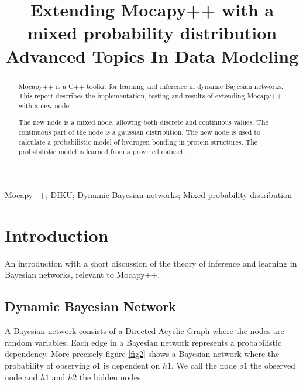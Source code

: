 \documentclass[10pt, conference, compsocconf,a4paper]{IEEEtran}
\begin{document}
\title{Extending Mocapy++ with a mixed probability distribution\\Advanced Topics In Data Modeling}

\author{
}

\maketitle

\begin{abstract}
Mocapy++ is a C++ toolkit for learning and inference in dynamic Bayesian networks. This report describes the implementation, testing and results of extending Mocapy++ with a new node. 

The new node is a mixed node, allowing both discrete and continuous values. The continuous part of the node is a gaussian distribution. The new node is used to calculate a probabilistic model of hydrogen bonding in protein structures. The probabilistic model is learned from a provided dataset.
\end{abstract}

\begin{IEEEkeywords}
Mocapy++; DIKU; Dynamic Bayesian networks; Mixed probability distribution
\end{IEEEkeywords}


\section{Introduction} %
\label{sec:introduction}

% 
% 

An introduction with a short discussion of the theory of inference and learning in Bayesian networks, relevant to Mocapy++.


\subsection{Dynamic Bayesian Network} %
\label{sub:dynamic_bayesian_network}
A Bayesian network consists of a Directed Acyclic Graph where the nodes are random variables. Each edge in a Bayesian network represents a probabilistic dependency. More precisely figure \ref{fig2} shows a Bayesian network where the probability of observing $o1$ is dependent on $h1$. We call the node $o1$ the observed node and $h1$ and $h2$ the hidden nodes. 
\end{document}
